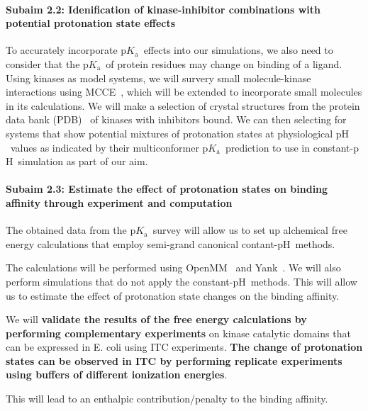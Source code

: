 \documentclass[10pt,final]{article}
\newcommand{\subsubsubsection}[1]{\paragraph*{#1}}
\newcommand{\pKa}{p$K_\mathrm{a}$\ }
\newcommand{\pH}{p$\mathrm{H}$\ }
\begin{document}
\subsubsubsection{Subaim 2.2: Idenification of kinase-inhibitor combinations with potential protonation state effects}
To accurately incorporate \pKa effects into our simulations, we also need to consider that the \pKa of protein residues may change on binding of a ligand. 
Using kinases as model systems, we will survery small molecule-kinase interactions using MCCE~\cite{Song2009a}, which will be extended to incorporate small molecules in its calculations.
We will make a selection of crystal structures from the protein data bank (PDB)~\cite{Berman2000a} of kinases with inhibitors bound. 
We can then selecting for systems that show potential mixtures of protonation states at physiological \pH values as indicated by their multiconformer \pKa prediction to use in constant-\pH simulation as part of our aim. 


\subsubsubsection{Subaim 2.3: Estimate the effect of protonation states on binding affinity through experiment and computation}
The obtained data from the \pKa survey will allow us to set up alchemical free energy calculations that employ semi-grand canonical contant-\pH methods.~\cite{Mongan2004a}

The calculations will be performed using OpenMM~\cite{Eastman2013a} and Yank~\cite{Chodera2015a}. We will also perform simulations that do not apply the constant-\pH methods. This will allow us to estimate the effect of protonation state changes on the binding affinity.

We will \textbf{validate the results of the free energy calculations by performing complementary experiments} on kinase catalytic domains that can be expressed in E. coli using ITC experiments. \textbf{The change of protonation states can be observed in ITC by performing replicate experiments using buffers of different ionization energies}.

This will lead to an enthalpic contribution/penalty to the binding affinity.
\end{document}
